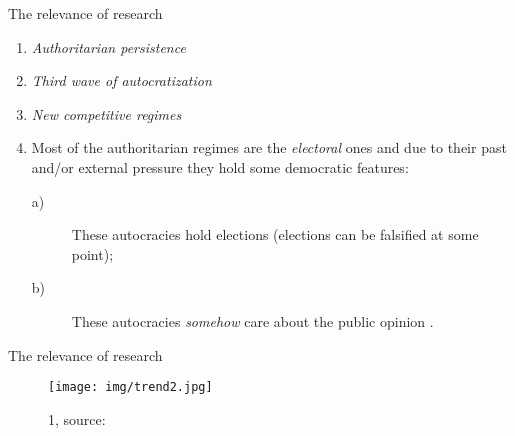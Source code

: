 \documentclass{beamer}
\begin{document}
\begin{frame}{The relevance of research}
    \begin{enumerate}
    
        \item \textit{Authoritarian persistence} \parencite{competition}
    
        \item \textit{Third wave of autocratization} \parencite{vdem}
        
        \item \textit{New competitive regimes} \parencite{newway}
        
        \item Most of the authoritarian regimes are the \textit{electoral} ones \parencite{shedler} and due to their past and/or external pressure they hold some democratic features:
        \begin{description}
        
            \item[a)]  These autocracies hold elections (elections can be falsified at some point);
            
            \item[b)] These autocracies \textit{somehow} care about the public opinion \parencite{inform}.
            
        \end{description}
    
    \end{enumerate}
    
\end{frame}

\begin{frame}{The relevance of research}
    \begin{figure}
        \centering
        
        \label{fig1}
        \texttt{[image: img/trend2.jpg]}
        \caption{1, source: \cite{vdem}}
    \end{figure}
\end{frame}
\end{document}
